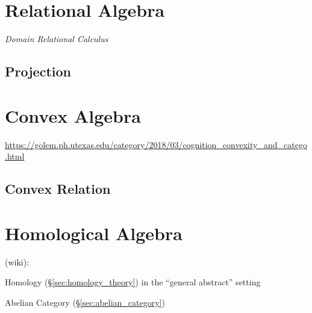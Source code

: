 \begin{itemize}
\section{Relational Algebra}\label{sec:relational_algebra}

\emph{Domain Relational Calculus}

\subsection{Projection}\label{sec:relational_projection}



\section{Convex Algebra}\label{sec:convex_algebra}


\url{https://golem.ph.utexas.edu/category/2018/03/cognition_convexity_and_catego.html}



\subsection{Convex Relation}\label{sec:convex_relation}



\section{Homological Algebra}\label{sec:homological_algebra}

(wiki):

Homology (\S\ref{sec:homology_theory}) in the ``general abstract'' setting

Abelian Category (\S\ref{sec:abelian_category})




\end{itemize}
